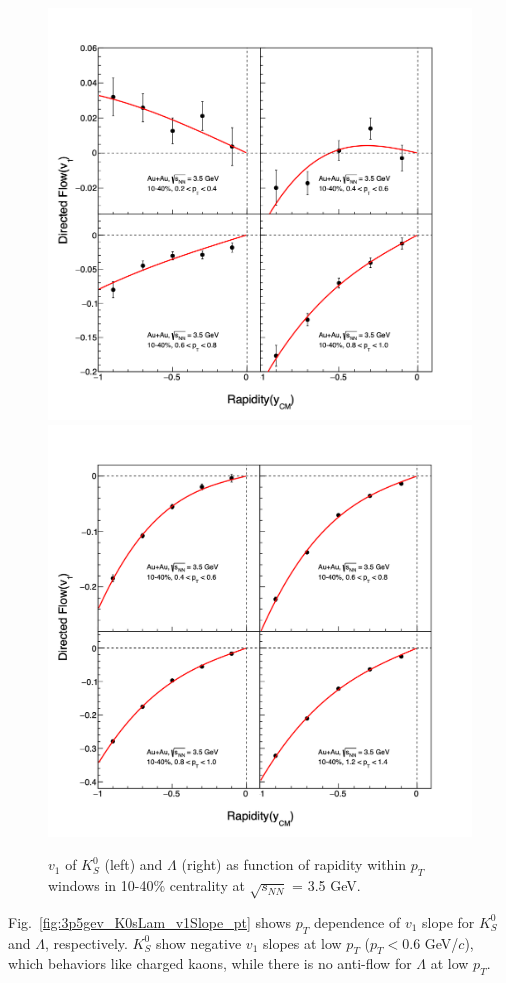 \begin{figure}[hbt!]
\centering
\includegraphics[width=0.45\linewidth]{figures/chapter03/3p5gev_K0s_v1VSy_pT_cent1.png}
\includegraphics[width=0.45\linewidth]{figures/chapter03/3p5gev_Lambda_v1VSy_pT_cent1.png}
\caption{$v_1$ of $K^0_S$ (left) and $\Lambda$ (right) as function of rapidity within $p_T$ windows in 10-40\% centrality at $\sqrt{s_{NN}}$ = 3.5 GeV.}
\label{fig:3p5gev_K0sLam_v1y_pt_cent1}
\end{figure}

Fig.~\ref{fig:3p5gev_K0sLam_v1Slope_pt} shows $p_T$ dependence of $v_1$ slope for $K^0_S$ and $\Lambda$, respectively.
$K^0_S$ show negative $v_1$ slopes at low $p_T$ ($p_T < 0.6$ GeV/$c$), which behaviors like charged kaons, 
while there is no anti-flow for $\Lambda$ at low $p_T$.

